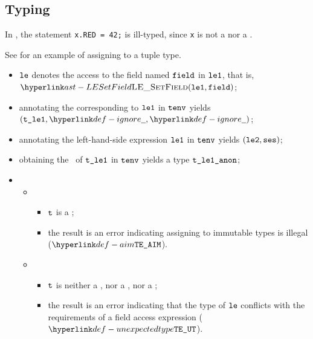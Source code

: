 \subsection{Typing}
In , the statement \verb|x.RED = 42;| is ill-typed,
since \verb|x| is not a \bitvectortypeterm{} nor a \structuredtypeterm.

See  for an example of assigning to a tuple type.

\ProseParagraph
\AllApply
\begin{itemize}
  \item $\texttt{le}$ denotes the access to the field named $\texttt{field}$ in $\texttt{le1}$, that is, \\ $\LESetField(\vleone, \vfield)$;
  \item annotating the \rhsexpression{} corresponding to $\texttt{le1}$ in $\texttt{tenv}$ yields \\ $(\vtleone, \Ignore, \Ignore)$\ProseOrTypeError;
  \item annotating the left-hand-side expression $\texttt{le1}$ in $\texttt{tenv}$ yields $(\texttt{le2}, \texttt{ses})$\ProseOrTypeError;
  \item obtaining the \underlyingtypeterm\ of $\texttt{t\_le1}$ in $\texttt{tenv}$ yields a type $\texttt{t\_le1\_anon}$\ProseOrTypeError;
  \item \OneApplies
  \begin{itemize}
    \item {}
    \begin{itemize}
      \item $\texttt{t}$ is a \tupletypeterm;
      \item the result is an error indicating assigning to immutable types is illegal ($\AssignmentToImmutable$).
    \end{itemize}

    \item {}
    \begin{itemize}
      \item $\texttt{t}$ is neither a \tupletypeterm{}, nor a \structuredtypeterm, nor a \bitvectortypeterm;
      \item the result is an error indicating that the type of $\texttt{le}$ conflicts with the requirements
            of a field access expression ($\UnexpectedType$).
    \end{itemize}
  \end{itemize}
\end{itemize}

